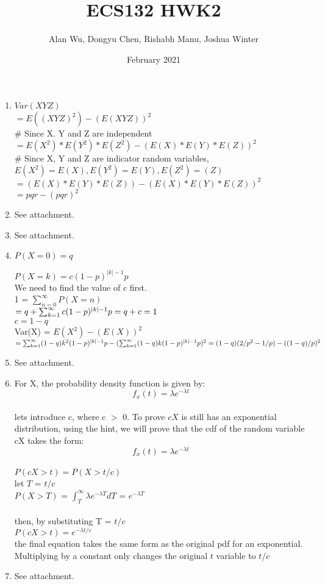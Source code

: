 \documentclass{article}
\title{ECS132 HWK2}
\author{Alan Wu, Dongyu  Chen, Rishabh Manu, Joshua Winter}
\date{February 2021}
\begin{document}
\maketitle


\begin{enumerate}
\item  $Var(XYZ)$
\\  $=  E((XYZ)^2)- (E(XYZ))^2 $
\\ \# Since X. Y and Z are independent
\\ $= E(X^2)*E(Y^2)*E(Z^2) -(E(X)*E(Y)*E(Z))^2$
\\ \# Since X, Y and Z are indicator random variables, $E(X^2)=E(X), E(Y^2) = E(Y), E(Z^2) =(Z)$
\\$= (E(X)*E(Y)*E(Z))-(E(X)*E(Y)*E(Z))^2$
\\$= pqr - (pqr)^2$
\item See attachment.
\item See attachment.
\item $P(X = 0) = q$

$P(X = k) = c (1-p)^{|k|-1} p$
\\We need to find the value of c first.
\\1 =  $ \sum_{n=0}^{\infty} P(X = n)  $
\\$= q + \sum_{k=1}^{\infty}  c (1-p)^{|k|-1} p 
\\ = q  + c
\\ =1$
\\$  c = 1-q$
\\Var(X) = $E(X^2) -(E(X))^2$
\\ $= \sum_{k=1}^{\infty}  (1-q) k^2 (1-p)^{|k|-1} p - (\sum_{k=1}^{\infty}  (1-q) k (1-p)^{|k|-1} p )^2
\\ = (1-q)(2/p^2 -1/p)- ((1-q)/p)^2$
\\ 
\item See attachment.
\item For X, the probability density function is given by:$$ f_x(t) = \lambda e ^ {-\lambda t}$$
\\ lets introduce c, where c $>$ 0. To prove $cX$ is still has an exponential distribution, using the hint, we will prove that the cdf of the random variable cX takes the form: $$ f_x(t) = \lambda e ^ {-\lambda t}$$
\\$P(cX > t) = P( X > t/c)$
\\let $T$ = $t/c$
\\$P(X > T)$ = $\int_T^{\infty} \lambda e ^ {-\lambda T} dT$ = $ e ^ {-\lambda T}$
\\
\\ then, by substituting T = $t/c$ 
\\$P(cX > t) = e ^ {-\lambda t/c}$
\\the final equation takes the same form as the original pdf for an exponential. Multiplying by a constant only changes the original $t$ variable to $t/c$
\item See attachment.
\end{enumerate}
\end{document}
